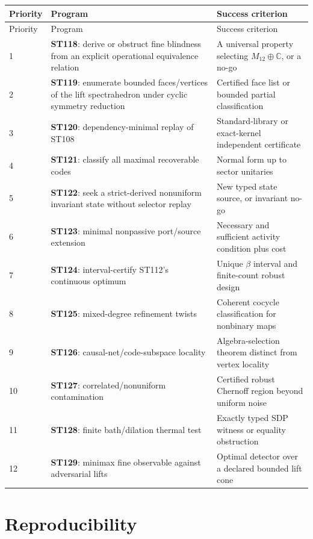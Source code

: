 \documentclass[11pt,a4paper]{article}
\begin{document}
\small
\begin{longtable}{@{}p{}p{}p{}@{}}
\toprule Priority & Program & Success criterion\\\midrule\endfirsthead
\toprule Priority & Program & Success criterion\\\midrule\endhead
1 & \textbf{ST118}: derive or obstruct fine blindness from an explicit operational equivalence relation & A universal property selecting $M_{12}\oplus\mathbb C$, or a no-go\\
2 & \textbf{ST119}: enumerate bounded faces/vertices of the lift spectrahedron under cyclic symmetry reduction & Certified face list or bounded partial classification\\
3 & \textbf{ST120}: dependency-minimal replay of ST108 & Standard-library or exact-kernel independent certificate\\
4 & \textbf{ST121}: classify all maximal recoverable codes & Normal form up to sector unitaries\\
5 & \textbf{ST122}: seek a strict-derived nonuniform invariant state without selector replay & New typed state source, or invariant no-go\\
6 & \textbf{ST123}: minimal nonpassive port/source extension & Necessary and sufficient activity condition plus cost\\
7 & \textbf{ST124}: interval-certify ST112's continuous optimum & Unique $\beta$ interval and finite-count robust design\\
8 & \textbf{ST125}: mixed-degree refinement twists & Coherent cocycle classification for nonbinary maps\\
9 & \textbf{ST126}: causal-net/code-subspace locality & Algebra-selection theorem distinct from vertex locality\\
10 & \textbf{ST127}: correlated/nonuniform contamination & Certified robust Chernoff region beyond uniform noise\\
11 & \textbf{ST128}: finite bath/dilation thermal test & Exactly typed SDP witness or equality obstruction\\
12 & \textbf{ST129}: minimax fine observable against adversarial lifts & Optimal detector over a declared bounded lift cone\\
\bottomrule
\end{longtable}
\normalsize

\section{Reproducibility}
\end{document}
